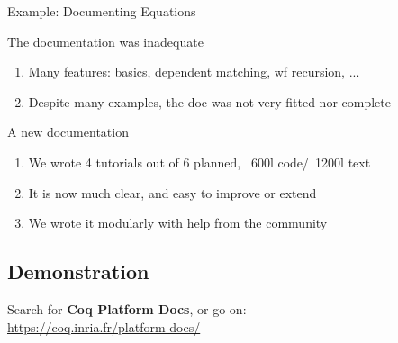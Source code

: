 \documentclass[10pt]{beamer}
\begin{document}
\begin{frame}{Example: Documenting Equations}
  \vspace*{-3pt}
  \begin{tcbPbl}{The documentation was inadequate}
    \begin{enumerate}
      \item Many features: basics, dependent matching, wf recursion, ...
      \item Despite many examples, the doc was not very fitted nor complete
    \end{enumerate}
  \end{tcbPbl}
  \vspace*{-3pt}
   \begin{tcbProp}{A new documentation}
    \begin{enumerate}
      \item We wrote 4 tutorials out of 6 planned, ~600l code/~1200l text
      \item It is now much clear, and easy to improve or extend
      \item We wrote it modularly with help from the community
    \end{enumerate}
  \end{tcbProp}
\end{frame}

\subsection{Demonstration}


\begin{frame}
  \begin{center}
    \large
    Search for \textbf{Coq Platform Docs}, or go on: \\
    \textcolor{blue}{\url{https://coq.inria.fr/platform-docs/}}
  \end{center}
\end{frame}
\end{document}
